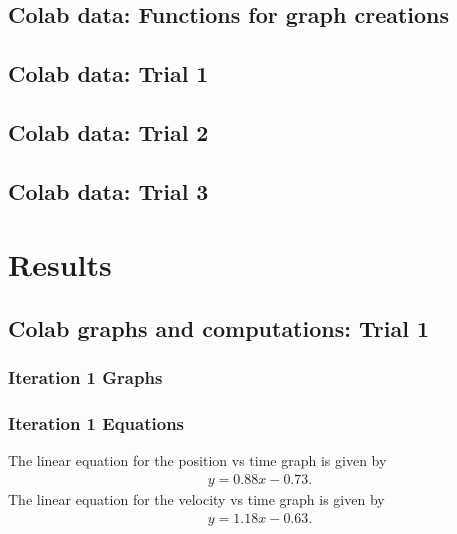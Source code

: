 \documentclass{report}
\begin{document}
    \bigbreak \noindent 
    \subsection{Colab data: Functions for graph creations}
    \bigbreak \noindent 

    \bigbreak \noindent 
    \subsection{Colab data: Trial 1}


    \bigbreak \noindent 
    \subsection{Colab data: Trial 2}


    \bigbreak \noindent 
    \subsection{Colab data: Trial 3}


    \pagebreak 
    \section{Results}
    \smallbreak \noindent
    \subsection{Colab graphs and computations: Trial 1}
    \smallbreak \noindent
    \subsubsection{Iteration 1 Graphs}
    \fc{}
    \subsubsection{Iteration 1 Equations}
    \bigbreak \noindent 
    The linear equation for the position vs time graph is given by
    \begin{align*}
        y = 0.88x -0.73
    .\end{align*}
    \bigbreak \noindent 
    The linear equation for the velocity vs time graph is given by
    \begin{align*}
        y=1.18x -0.63
    .\end{align*}
\end{document}
